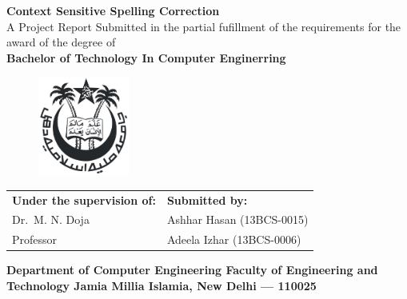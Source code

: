 \begin{titlepage}
    \begin{center}
        {%
            \fontsize{16pt}{19pt}\selectfont
            \textbf{Context Sensitive Spelling Correction}\\[\baselineskip]
        }
        {%
            \fontsize{14pt}{17pt}\selectfont
            A Project Report\linebreak
            Submitted in the partial fufillment of the requirements for the award of the degree of\\[\baselineskip]
        }
        {%
            \fontsize{16pt}{19pt}\selectfont
            \textbf{%
                Bachelor of Technology\linebreak
                In\linebreak
                Computer Enginerring
            }
        }

        \vspace{20mm}
        \begin{figure}[H]
            \centering
            \includegraphics[width=30mm]{jmi.png}
        \end{figure}
        \vspace{20mm}

        {%
            \fontsize{14}{17}\selectfont

            \begin{center}
                \begin{tabularx}{\textwidth}{L R}
                    \textbf{Under the supervision of:} & \textbf{Submitted by:}\\
                    Dr.\ M. N. Doja                    & Ashhar Hasan (13BCS-0015)\\
                    Professor                          & Adeela Izhar (13BCS-0006)
                \end{tabularx}
            \end{center}

            \vfill

            \textbf{%
                Department of Computer Engineering\linebreak
                Faculty of Engineering and Technology\linebreak
                Jamia Millia Islamia, New Delhi --- 110025
            }
        }
    \end{center}
\end{titlepage}

